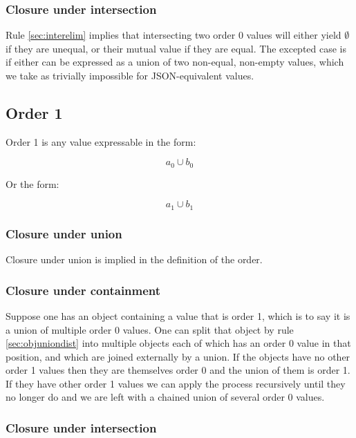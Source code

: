 \documentclass[letterpaper]{article}
\begin{document}
\subsubsection{Closure under intersection}

Rule \ref{sec:interelim} implies that intersecting two order 0 values will
either yield \(\emptyset\) if they are unequal, or their mutual value if they
are equal. The excepted case is if either can be expressed as a union of two
non-equal, non-empty values, which we take as trivially impossible for
JSON-equivalent values.

\subsection{Order 1}

Order 1 is any value expressable in the form:

\begin{equation}
a_0 \cup b_0
\end{equation}

Or the form:

\begin{equation}
a_1 \cup b_1
\end{equation}

\subsubsection{Closure under union}

Closure under union is implied in the definition of the order.

\subsubsection{Closure under containment}

Suppose one has an object containing a value that is order 1, which is to say
it is a union of multiple order 0 values. One can split that object by rule
\ref{sec:objuniondist} into multiple objects each of which has an order 0 value in
that position, and which are joined externally by a union. If the objects have
no other order 1 values then they are themselves order 0 and the union of them is
order 1. If they have other order 1 values we can apply the process recursively
until they no longer do and we are left with a chained union of several order 0
values.

\subsubsection{Closure under intersection}
\end{document}

